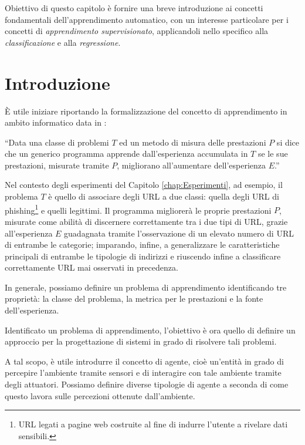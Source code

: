 \documentclass[../../main.tex]{subfiles}
\begin{document}
    Obiettivo di questo capitolo è fornire una breve introduzione ai concetti fondamentali dell'apprendimento automatico, con un interesse particolare per i concetti di \textit{apprendimento supervisionato}, applicandoli nello specifico alla \textit{classificazione} e alla \textit{regressione}.

    \section{Introduzione}

    È utile iniziare riportando la formalizzazione del concetto di apprendimento in ambito informatico data in \cite{Mitchell97}:
    
    ``Data una classe di problemi $T$ ed un metodo di misura delle prestazioni $P$ si dice che un generico programma apprende dall'esperienza accumulata in $T$ se le sue prestazioni, misurate tramite $P$, migliorano all'aumentare dell'esperienza $E$.'' 

    Nel contesto degli esperimenti del Capitolo \ref{chap:Esperimenti}, ad esempio, il problema $T$ è quello di associare degli URL a due classi: quella degli URL di phishing\footnote{URL legati a pagine web costruite al fine di indurre l'utente a rivelare dati sensibili.} e quelli legittimi. Il programma migliorerà le proprie prestazioni $P$, misurate come abilità di discernere correttamente tra i due tipi di URL, grazie all'esperienza  $E$ guadagnata tramite l'osservazione di un elevato numero di URL di entrambe le categorie; imparando, infine, a generalizzare le caratteristiche principali di entrambe le tipologie di indirizzi e riuscendo infine a classificare correttamente  URL mai osservati in precedenza.

    In generale, possiamo definire un problema di apprendimento identificando tre proprietà: la classe del problema, la metrica per le prestazioni e la fonte dell'esperienza.

    Identificato un problema di apprendimento, l'obiettivo è ora quello di definire un approccio per la progettazione di sistemi in grado di risolvere tali problemi.

    A tal scopo, è utile introdurre il concetto di agente, cioè un'entità in grado di percepire l'ambiente tramite sensori e di interagire con tale ambiente tramite degli attuatori. Possiamo definire diverse tipologie di agente a seconda di come questo lavora sulle percezioni ottenute dall'ambiente.
\end{document}
